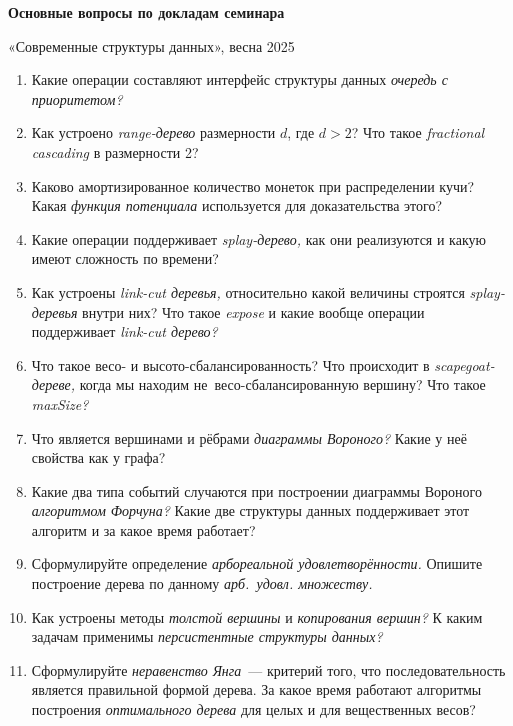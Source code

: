 \documentclass[a4paper,10pt]{article}
\begin{document}
  \begin{center}
  \large\bf Основные вопросы по докладам семинара
  
  «Современные структуры данных», весна 2025
\end{center}

\begin{enumerate}[leftmargin=*,itemsep=-0.1mm]
\item Какие операции составляют интерфейс структуры данных {\sl очередь с приоритетом?}

\item Как устроено {\sl range-дерево} размерности \(d\), где \(d>2\)? Что такое {\sl fractional cascading} в размерности 2?

\item Каково амортизированное количество монеток при распределении кучи? Какая {\sl функция потенциала} используется для доказательства этого?

\item Какие операции поддерживает {\sl splay-дерево,} как они реализуются и какую имеют сложность по времени?

\item Как устроены {\sl link-cut деревья,} относительно какой величины строятся {\sl splay-деревья} внутри них? Что такое {\sl expose} и какие вообще операции поддерживает {\sl link-cut дерево?}

\item Что такое весо- и высото-сбалансированность? Что происходит в {\sl scapegoat-дереве,} когда мы находим не~весо-сбалансированную вершину? Что такое {\sl maxSize?}

\item Что является вершинами и рёбрами {\sl диаграммы Вороного?} Какие у неё свойства как у графа?

\item Какие два типа событий случаются при построении диаграммы Вороного {\sl алгоритмом Форчуна?} Какие две структуры данных поддерживает этот алгоритм и за какое время работает?

\item Сформулируйте определение {\sl арбореальной удовлетворённости.} Опишите построение дерева по данному {\sl арб.~удовл. множеству.}

\item Как устроены методы {\sl толстой вершины} и {\sl копирования вершин?} К каким задачам применимы {\sl персистентные структуры данных?}

\item Сформулируйте {\sl неравенство Янга}~— критерий того, что последовательность является правильной формой дерева. За какое время работают алгоритмы построения {\sl оптимального дерева} для целых и для вещественных весов?


\end{enumerate}
\end{document}
